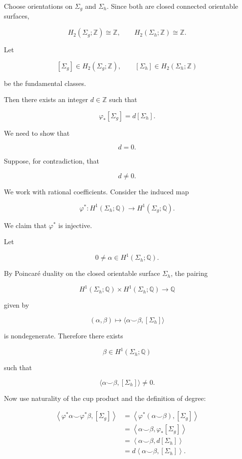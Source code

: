 \begin{solution}
Choose orientations on \(\Sigma_g\) and \(\Sigma_h\). Since both are closed connected orientable surfaces,

\[
H_2(\Sigma_g;\mathbb Z)\cong \mathbb Z,
\qquad
H_2(\Sigma_h;\mathbb Z)\cong \mathbb Z.
\]

Let

\[
[\Sigma_g]\in H_2(\Sigma_g;\mathbb Z),
\qquad
[\Sigma_h]\in H_2(\Sigma_h;\mathbb Z)
\]

be the fundamental classes.

Then there exists an integer \(d\in \mathbb Z\) such that

\[
\varphi_*[\Sigma_g]=d[\Sigma_h].
\]

We need to show that

\[
d=0.
\]

Suppose, for contradiction, that

\[
d\neq 0.
\]

We work with rational coefficients. Consider the induced map

\[
\varphi^*:H^1(\Sigma_h;\mathbb Q)\longrightarrow H^1(\Sigma_g;\mathbb Q).
\]

We claim that \(\varphi^*\) is injective.

Let

\[
0\neq \alpha\in H^1(\Sigma_h;\mathbb Q).
\]

By Poincaré duality on the closed orientable surface \(\Sigma_h\), the pairing

\[
H^1(\Sigma_h;\mathbb Q)\times H^1(\Sigma_h;\mathbb Q)
\longrightarrow
\mathbb Q
\]

given by

\[
(\alpha,\beta)
\longmapsto
\langle \alpha\smile \beta,[\Sigma_h]\rangle
\]

is nondegenerate. Therefore there exists

\[
\beta\in H^1(\Sigma_h;\mathbb Q)
\]

such that

\[
\langle \alpha\smile \beta,[\Sigma_h]\rangle\neq 0.
\]

Now use naturality of the cup product and the definition of degree:

\[
\begin{aligned}
	\left\langle \varphi^*\alpha\smile \varphi^*\beta,[\Sigma_g]\right\rangle
	&=
	\left\langle \varphi^*(\alpha\smile \beta),[\Sigma_g]\right\rangle \\
	&=
	\left\langle \alpha\smile \beta,\varphi_*[\Sigma_g]\right\rangle \\
	&=
	\left\langle \alpha\smile \beta,d[\Sigma_h]\right\rangle \\
	&=
	d\left\langle \alpha\smile \beta,[\Sigma_h]\right\rangle.
\end{aligned}
\]


\end{solution}
